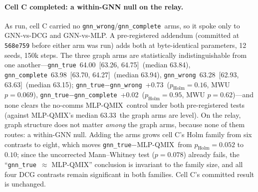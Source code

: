 \documentclass[10pt]{article}
\newcommand{\algoname}[1]{\textsc{#1}}
\newcommand{\mlpqmix}{\algoname{MLP-QMIX}}
\newcommand{\gtrue}{\texttt{gnn\_true}}
\newcommand{\gwrong}{\texttt{gnn\_wrong}}
\newcommand{\gcomplete}{\texttt{gnn\_complete}}
\newcommand{\CBCgnn}{64.00}            %
\newcommand{\CBCgnnMed}{63.84}
\newcommand{\CBCgnnCI}{[63.26, 64.75]}
\newcommand{\CBCmlpMed}{63.33}
\newcommand{\CRcomplete}{63.98}        %
\newcommand{\CRcompleteMed}{63.94}
\newcommand{\CRcompleteCI}{[63.70, 64.27]}
\newcommand{\CRwrong}{63.28}           %
\newcommand{\CRwrongMed}{63.15}
\newcommand{\CRwrongCI}{[62.93, 63.63]}
\newcommand{\CRtwGap}{+0.73}           %
\newcommand{\CRtcGap}{+0.02}           %
\newcommand{\CRtmHolm}{0.10}           %
\newcommand{\CRtmHolmSix}{0.052}       %
\begin{document}
\paragraph{Cell C completed: a within-GNN null on the relay.} As run, cell C
carried no \gwrong/\gcomplete\ arms, so it spoke only to GNN-vs-DCG and
GNN-vs-MLP. A pre-registered addendum (committed at \texttt{568e759} before
either arm was run) adds both at byte-identical parameters, 12 seeds, 150k
steps. The three graph arms are statistically indistinguishable from one
another---\gtrue\ \CBCgnn\ \CBCgnnCI\ (median \CBCgnnMed), \gcomplete\
\CRcomplete\ \CRcompleteCI\ (median \CRcompleteMed), \gwrong\ \CRwrong\
\CRwrongCI\ (median \CRwrongMed); \gtrue$-$\gwrong\ \CRtwGap\
($p_{\text{Holm}}{=}0.16$, MWU $p{=}0.069$), \gtrue$-$\gcomplete\ \CRtcGap\
($p_{\text{Holm}}{=}0.95$, MWU $p{=}0.62$)---and none clears the no-comms
\mlpqmix\ control under both pre-registered tests (against \mlpqmix's median
\CBCmlpMed\ the graph arms are level). On the relay, graph structure does not
matter \emph{among} the graph arms, because none of them routes: a within-GNN
null. Adding the arms grows cell C's Holm family from six contrasts to eight,
which moves \gtrue$-$\mlpqmix\ from $p_{\text{Holm}}{=}\CRtmHolmSix$ to
$\CRtmHolm$; since the uncorrected Mann--Whitney test ($p{=}0.078$) already
fails, the ``\gtrue\ $\approx$ \mlpqmix'' conclusion is invariant to the family
size, and all four DCG contrasts remain significant in both families. Cell C's
committed result is unchanged.
\end{document}

